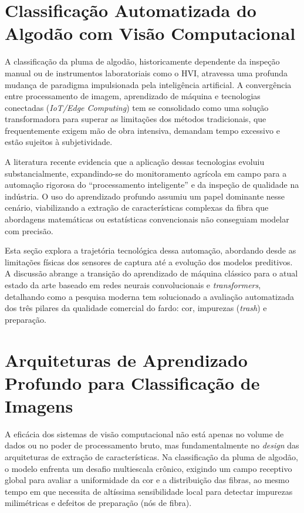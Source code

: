     

\section{Classificação Automatizada do Algodão com Visão Computacional}
\label{sec:classificacao_algodao}

    A classificação da pluma de algodão, historicamente dependente da inspeção manual ou de instrumentos laboratoriais como o HVI, atravessa uma profunda mudança de paradigma impulsionada pela inteligência artificial. A convergência entre processamento de imagem, aprendizado de máquina e tecnologias conectadas (\textit{IoT/Edge Computing}) tem se consolidado como uma solução transformadora para superar as limitações dos métodos tradicionais, que frequentemente exigem mão de obra intensiva, demandam tempo excessivo e estão sujeitos à subjetividade.

    A literatura recente evidencia que a aplicação dessas tecnologias evoluiu substancialmente, expandindo-se do monitoramento agrícola em campo para a automação rigorosa do ``processamento inteligente'' e da inspeção de qualidade na indústria. O uso do aprendizado profundo assumiu um papel dominante nesse cenário, viabilizando a extração de características complexas da fibra que abordagens matemáticas ou estatísticas convencionais não conseguiam modelar com precisão.

    Esta seção explora a trajetória tecnológica dessa automação, abordando desde as limitações físicas dos sensores de captura até a evolução dos modelos preditivos. A discussão abrange a transição do aprendizado de máquina clássico para o atual estado da arte baseado em redes neurais convolucionais e \textit{transformers}, detalhando como a pesquisa moderna tem solucionado a avaliação automatizada dos três pilares da qualidade comercial do fardo: cor, impurezas (\textit{trash}) e preparação.

    

\section{Arquiteturas de Aprendizado Profundo para Classificação de Imagens}
\label{sec:arquiteturas}

    A eficácia dos sistemas de visão computacional não está apenas no volume de dados ou no poder de processamento bruto, mas fundamentalmente no \textit{design} das arquiteturas de extração de características. Na classificação da pluma de algodão, o modelo enfrenta um desafio multiescala crônico, exigindo um campo receptivo global para avaliar a uniformidade da cor e a distribuição das fibras, ao mesmo tempo em que necessita de altíssima sensibilidade local para detectar impurezas milimétricas e defeitos de preparação (nós de fibra).


